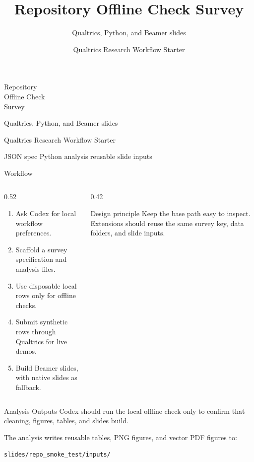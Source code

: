 \documentclass[aspectratio=169]{beamer}
\title{Repository Offline Check Survey}
\subtitle{Qualtrics, Python, and Beamer slides}
\author{Qualtrics Research Workflow Starter}
\date{}
\begin{document}
{
\begin{frame}[plain]
  \vfill
  {\Huge Repository\\Offline Check\\Survey\par}
  \vspace{0.45cm}
  {\Large\color{white} Qualtrics, Python, and Beamer slides\par}
  \vspace{0.35cm}
  {\large\color{white!82} Qualtrics Research Workflow Starter\par}
  \vfill
  {\small\color{StarterGold} JSON spec \quad Python analysis \quad reusable slide inputs}
\end{frame}
}

\begin{frame}{Workflow}
  \begin{columns}[T,onlytextwidth]
    \begin{column}{0.52\textwidth}
      \begin{enumerate}
        \item Ask Codex for local workflow preferences.
        \item Scaffold a survey specification and analysis files.
        \item Use disposable local rows only for offline checks.
        \item Submit synthetic rows through Qualtrics for live demos.
        \item Build Beamer slides, with native slides as fallback.
      \end{enumerate}
    \end{column}
    \begin{column}{0.42\textwidth}
      \begin{block}{Design principle}
        Keep the base path easy to inspect. Extensions should reuse the same survey key, data folders, and slide inputs.
      \end{block}
    \end{column}
  \end{columns}
\end{frame}

\begin{frame}{Analysis Outputs}
  Codex should run the local offline check only to confirm that cleaning, figures, tables, and slides build.

  \vspace{0.25cm}
  The analysis writes reusable tables, PNG figures, and vector PDF figures to:

  \vspace{0.25cm}
  \texttt{slides/repo\_smoke\_test/inputs/}
\end{frame}
\end{document}
